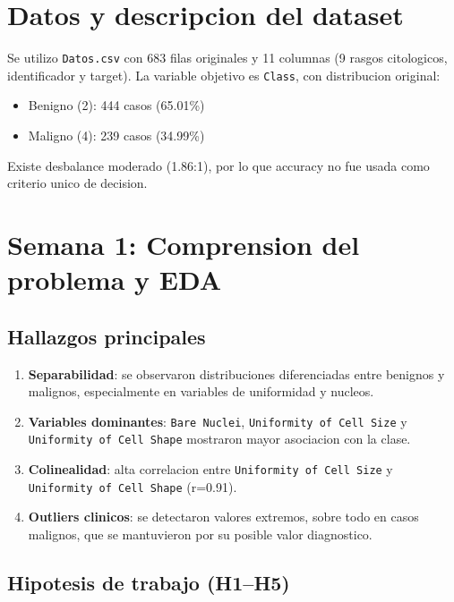 \documentclass[11pt,a4paper]{article}
\begin{document}
\section{Datos y descripcion del dataset}

Se utilizo \texttt{Datos.csv} con 683 filas originales y 11 columnas (9 rasgos citologicos, identificador y target). La variable objetivo es \texttt{Class}, con distribucion original:

\begin{itemize}[leftmargin=1.2cm]
\item Benigno (2): 444 casos (65.01\%)
\item Maligno (4): 239 casos (34.99\%)
\end{itemize}

Existe desbalance moderado (1.86:1), por lo que accuracy no fue usada como criterio unico de decision.

\section{Semana 1: Comprension del problema y EDA}

\subsection{Hallazgos principales}

\begin{enumerate}[leftmargin=1.2cm]
\item \textbf{Separabilidad}: se observaron distribuciones diferenciadas entre benignos y malignos, especialmente en variables de uniformidad y nucleos.
\item \textbf{Variables dominantes}: \texttt{Bare Nuclei}, \texttt{Uniformity of Cell Size} y \texttt{Uniformity of Cell Shape} mostraron mayor asociacion con la clase.
\item \textbf{Colinealidad}: alta correlacion entre \texttt{Uniformity of Cell Size} y \texttt{Uniformity of Cell Shape} (r=0.91).
\item \textbf{Outliers clinicos}: se detectaron valores extremos, sobre todo en casos malignos, que se mantuvieron por su posible valor diagnostico.
\end{enumerate}

\subsection{Hipotesis de trabajo (H1--H5)}
\end{document}
